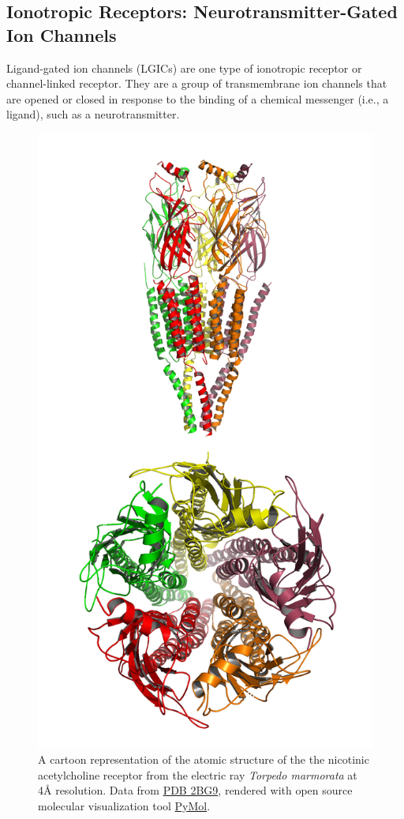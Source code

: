 \hypertarget{ionotropic-receptors-neurotransmitter-gated-ion-channels}{%
\subsection{Ionotropic Receptors: Neurotransmitter-Gated Ion Channels}\label{ionotropic-receptors-neurotransmitter-gated-ion-channels}}

Ligand-gated ion channels (LGICs) are one type of ionotropic receptor or channel-linked receptor. They are a group of transmembrane ion channels that are opened or closed in response to the binding of a chemical messenger (i.e., a ligand), such as a neurotransmitter.



\begin{figure}

{\centering \includegraphics[width=0.7\linewidth]{./figures/synapse/nAch_receptor} 

}

\caption{A cartoon representation of the atomic structure of the the nicotinic acetylcholine receptor from the electric ray \emph{Torpedo marmorata} at 4Å resolution. Data from \href{https://www.rcsb.org/structure/2BG9}{PDB 2BG9}, rendered with open source molecular visualization tool \href{https://pymol.org/2/}{PyMol}.}\label{fig:achr}
\end{figure}

